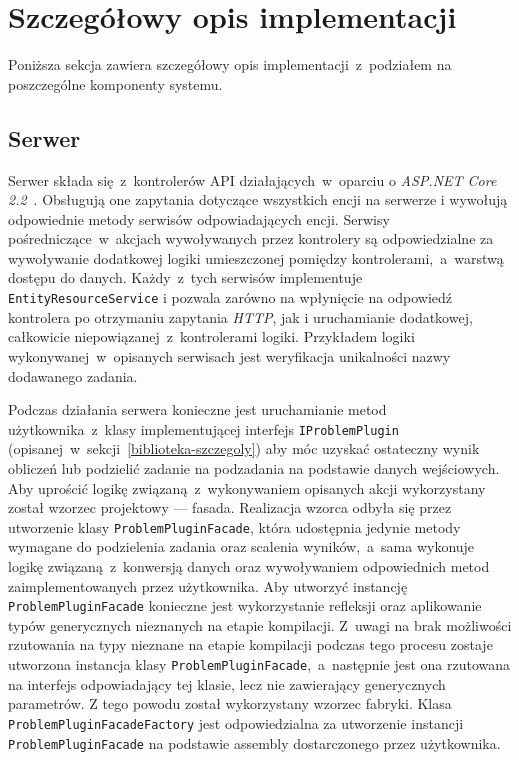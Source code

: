 \documentclass[a4paper,11pt,twoside]{report}
\theoremstyle{definition}
\begin{document}
\section{Szczegółowy opis implementacji}
\label{szczegolowy-opis-implementacji}

Poniższa sekcja zawiera szczegółowy opis implementacji~z~podziałem na poszczególne komponenty systemu.


\subsection{Serwer}

Serwer składa się~z~kontrolerów API działających~w~oparciu o \textit{ASP.NET Core 2.2}~\cite{aspnet-core}.
Obsługują one zapytania dotyczące wszystkich encji na serwerze i wywołują odpowiednie metody serwisów odpowiadających encji.
Serwisy pośredniczące~w~akcjach wywoływanych przez kontrolery są odpowiedzialne za wywoływanie dodatkowej logiki umieszczonej pomiędzy kontrolerami,~a~warstwą dostępu do danych.
Każdy~z~tych serwisów implementuje \texttt{EntityResourceService} i pozwala zarówno na wpłynięcie na odpowiedź kontrolera po otrzymaniu zapytania \textit{HTTP}, jak i uruchamianie dodatkowej, całkowicie niepowiązanej~z~kontrolerami logiki.
Przykładem logiki wykonywanej~w~opisanych serwisach jest weryfikacja unikalności nazwy dodawanego zadania.

Podczas działania serwera konieczne jest uruchamianie metod użytkownika~z~klasy implementującej interfejs \texttt{IProblemPlugin} (opisanej~w~sekcji~\ref{biblioteka-szczegoly}) aby móc uzyskać ostateczny wynik obliczeń lub podzielić zadanie na podzadania na podstawie danych wejściowych.
Aby uprościć logikę związaną~z~wykonywaniem opisanych akcji wykorzystany został wzorzec projektowy --- fasada.
Realizacja wzorca odbyła się przez utworzenie klasy \texttt{ProblemPluginFacade}, która udostępnia jedynie metody wymagane do podzielenia zadania oraz scalenia wyników,~a~sama wykonuje logikę związaną~z~konwersją danych oraz wywoływaniem odpowiednich metod zaimplementowanych przez użytkownika.
Aby utworzyć instancję \texttt{ProblemPluginFacade} konieczne jest wykorzystanie refleksji oraz aplikowanie typów generycznych nieznanych na etapie kompilacji.
Z~uwagi na brak możliwości rzutowania na typy nieznane na etapie kompilacji podczas tego procesu zostaje utworzona instancja klasy \texttt{ProblemPluginFacade},~a~następnie jest ona rzutowana na interfejs odpowiadający tej klasie, lecz nie zawierający generycznych parametrów.
Z tego powodu został wykorzystany wzorzec fabryki.
Klasa \texttt{ProblemPluginFacadeFactory} jest odpowiedzialna za utworzenie instancji \texttt{ProblemPluginFacade} na podstawie assembly dostarczonego przez użytkownika.
\end{document}
